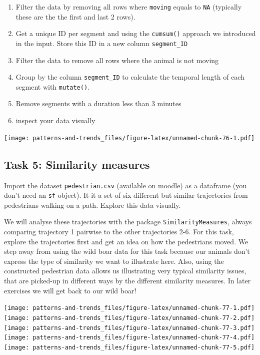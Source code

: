 \documentclass[
]{book}
\providecommand{\tightlist}{%
  \setlength{\itemsep}{0pt}\setlength{\parskip}{0pt}}
\begin{document}
\begin{enumerate}
\def\labelenumi{\arabic{enumi}.}
\tightlist
\item
  Filter the data by removing all rows where \texttt{moving} equals to \texttt{NA} (typically these are the the first and last 2 rows).
\item
  Get a unique ID per segment and using the \texttt{cumsum()} approach we introduced in the input. Store this ID in a new column \texttt{segment\_ID}
\item
  Filter the data to remove all rows where the animal is not moving
\item
  Group by the column \texttt{segment\_ID} to calculate the temporal length of each segment with \texttt{mutate()}.
\item
  Remove segments with a duration less than 3 minutes
\item
  inspect your data visually
\end{enumerate}

\texttt{[image: patterns-and-trends\_files/figure-latex/unnamed-chunk-76-1.pdf]}

\hypertarget{task-5-similarity-measures}{%
\subsection{Task 5: Similarity measures}\label{task-5-similarity-measures}}

Import the dataset \texttt{pedestrian.csv} (available on moodle) as a dataframe (you don't need an \texttt{sf} object). It it a set of six different but similar trajectories from pedestrians walking on a path. Explore this data visually.

We will analyse these trajectories with the package \texttt{SimilarityMeasures}, always comparing trajectory 1 pairwise to the other trajectories 2-6. For this task, explore the trajectories first and get an idea on how the pedestrians moved. We step away from using the wild boar data for this task because our animals don't express the type of similarity we want to illustrate here. Also, using the constructed pedestrian data allows us illustrating very typical similarity issues, that are picked-up in different ways by the different similarity measures. In later exercises we will get back to our wild boar!

\texttt{[image: patterns-and-trends\_files/figure-latex/unnamed-chunk-77-1.pdf]} \texttt{[image: patterns-and-trends\_files/figure-latex/unnamed-chunk-77-2.pdf]} \texttt{[image: patterns-and-trends\_files/figure-latex/unnamed-chunk-77-3.pdf]} \texttt{[image: patterns-and-trends\_files/figure-latex/unnamed-chunk-77-4.pdf]} \texttt{[image: patterns-and-trends\_files/figure-latex/unnamed-chunk-77-5.pdf]}
\end{document}
